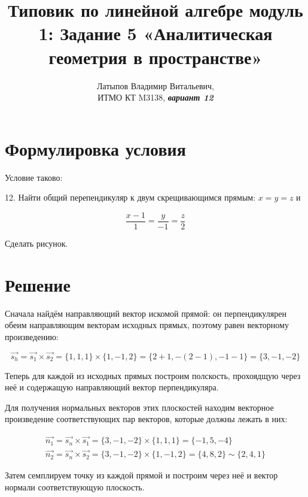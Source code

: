 \documentclass[12pt, a4paper]{article}
\author{Латыпов Владимир Витальевич, \\ ИТМО КТ M3138, \Huge{\textit{\textbf{вариант 12}}}}
\title{Типовик по линейной алгебре модуль 1: Задание 5 «Аналитическая геометрия в пространстве»}
\begin{document}
    \tittoc

    \section{Формулировка условия}

    \begin{statement}
        Условие таково: 
        
        12. Найти общий перепендикуляр к двум скрещивающимся прямым:
        $x = y = z$ и
        
        \begin{equation}
            \frac{x − 1}{1} = \frac{y}{-1} = \frac{z}{2}
        \end{equation}

        Сделать рисунок.
    \end{statement}

    \section{Решение}

    Сначала найдём направляющий вектор искомой прямой: 
    он перпендикулярен обеим направляющим векторам исходных прямых,
    поэтому равен векторному произведению:

    \begin{equation}
        \vec{s_h} = \vec{s_1} \times \vec{s_2} 
        = \{ 1, 1, 1 \} \times \{ 1, -1, 2 \} = 
        \{ 2 + 1, -(2 - 1), -1 - 1 \} = \{ 3, -1, -2 \}
    \end{equation}

    Теперь для каждой из исходных прямых построим полскость, 
    прохоядщую через неё 
    и содержащую направляющий вектор перпендикуляра.

    Для получения нормальных векторов этих плоскостей находим векторное произведение
    соответствующих пар векторов, которые должны лежать в них:
    
    \begin{gather}
        \vec{n_1} = \vec{s_n} \times \vec{s_1} = \{ 3, -1, -2 \} \times \{ 1, 1, 1 \} = \{ -1, 5, -4 \} \\
        \vec{n_2} = \vec{s_n} \times \vec{s_2} = \{ 3, -1, -2 \} \times \{ 1, -1, 2 \} = \{ 4, 8, 2 \} \sim \{ 2, 4, 1 \}
    \end{gather}

    Затем семплируем точку из каждой прямой и построим через неё и вектор нормали соответствующую плоскость.
\end{document}
